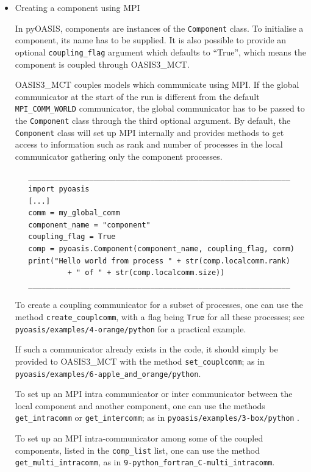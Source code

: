 \begin{itemize}
\item{Creating a component using MPI}
\label{index:creating-a-component-using-mpi}

In pyOASIS, components are instances of the {\tt Component} class. To
initialise a component, its name has to be supplied. 
It is also possible to provide an optional  {\tt coupling\_flag} argument which
defaults to “True”, which means the component is coupled through OASIS3\_MCT. 

OASIS3\_MCT couples models which communicate using MPI.
If the global communicator at the start of the run is different from
the default  {\tt MPI\_COMM\_WORLD} communicator, the global
communicator has to be passed to the {\tt Component} class through the
third optional argument. By default, the
{\tt Component} class will set up MPI internally and provides methods
to get access to information such as rank and number of processes in
the local communicator gathering only the component processes.

\begin{verbatim}
   ____________________________________________________________
   import pyoasis
   [...]
   comm = my_global_comm
   component_name = "component"
   coupling_flag = True
   comp = pyoasis.Component(component_name, coupling_flag, comm)
   print("Hello world from process " + str(comp.localcomm.rank) 
            + " of " + str(comp.localcomm.size))
   ____________________________________________________________
\end{verbatim}

To create a coupling communicator for a subset of processes, one can
use the method {\tt create\_couplcomm}, with a flag being {\tt True} for all these
processes; see {\tt pyoasis/examples/4-orange/python} for a practical example.

If such a communicator already exists in the code, it should simply be
provided to OASIS3\_MCT with the method {\tt set\_couplcomm}; 
as in {\tt pyoasis/examples/6-apple\_and\_orange/python}. 

To set up an MPI intra communicator or inter communicator between the local component and
another component, one can use the methods {\tt get\_intracomm} or {\tt get\_intercomm}; 
\newline
as in {\tt pyoasis/examples/3-box/python} . 

To set up an MPI intra-communicator among some of the coupled components, listed in the {\tt comp\_list}  list,
one can use the method {\tt get\_multi\_intracomm}, as in {\tt 9-python\_fortran\_C-multi\_intracomm}. 


\end{itemize}

